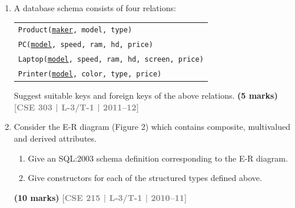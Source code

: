 \documentclass[12pt,a3paper]{article}
\newcommand{\yr}[1]{\hfill\textcolor{gray}{\small\textbf{[#1]}}}
\newcommand{\mk}[1]{\textcolor{orange!70!black}{\small\textbf{(#1 marks)}}}
\begin{document}
\begin{enumerate}
\begin{center}
\end{center}

\mk{15} \yr{CSE 303 | L-3/T-1 | 2012--13}


\item A database schema consists of four relations:
\begin{center}
\begin{tabular}{l}
\texttt{Product(\underline{maker}, model, type)}\\
\texttt{PC(\underline{model}, speed, ram, hd, price)}\\
\texttt{Laptop(\underline{model}, speed, ram, hd, screen, price)}\\
\texttt{Printer(\underline{model}, color, type, price)}
\end{tabular}
\end{center}
Suggest suitable keys and foreign keys of the above relations.
\mk{5} \yr{CSE 303 | L-3/T-1 | 2011--12}

\item Consider the E-R diagram (Figure 2) which contains composite, multivalued and derived attributes.
\begin{enumerate}
  \item Give an SQL:2003 schema definition corresponding to the E-R diagram.
  \item Give constructors for each of the structured types defined above.
\end{enumerate}
\mk{10} \yr{CSE 215 | L-3/T-1 | 2010--11}

\end{enumerate}
\end{document}
